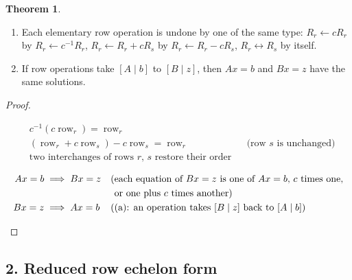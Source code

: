 \documentclass[12pt]{article}
\theoremstyle{definition}
\newtheorem{theorem}{Theorem}
\newcommand{\boardtop}{\vspace*{-\abovedisplayskip}}
\DeclareMathOperator{\row}{row}
\begin{document}
\begin{theorem}\label{b2.3}
\begin{enumerate}
\item Each elementary row operation is undone by one of the same type: \(R_r\leftarrow cR_r\) by
\(R_r\leftarrow c^{-1}R_r\), \(R_r\leftarrow R_r+cR_s\) by \(R_r\leftarrow R_r-cR_s\), \(R_r\leftrightarrow R_s\) by
itself.
\item If row operations take \([A\mid b]\) to \([B\mid z]\), then \(Ax=b\) and \(Bx=z\) have the same solutions.
\end{enumerate}
\end{theorem}
\begin{proof}
\begin{board}
\boardtop
\begin{align*}
&c^{-1}(c\row_r)=\row_r\\
&(\row_r+c\row_s)-c\row_s=\row_r&&\text{(row \(s\) is unchanged)}\\
&\text{two interchanges of rows \(r\), \(s\) restore their order}
\end{align*}
\end{board}
\begin{board}
\boardtop
\begin{align*}
Ax=b&\implies Bx=z&&\text{(each equation of \(Bx=z\) is one of \(Ax=b\), \(c\) times one,}\\
&&&\text{\phantom{(}or one plus \(c\) times another)}\\
Bx=z&\implies Ax=b&&\text{((a): an operation takes \([B\mid z]\) back to \([A\mid b]\))}
\end{align*}
\end{board}
\nopagebreak
\end{proof}

\subsection*{2. Reduced row echelon form}
\end{document}

